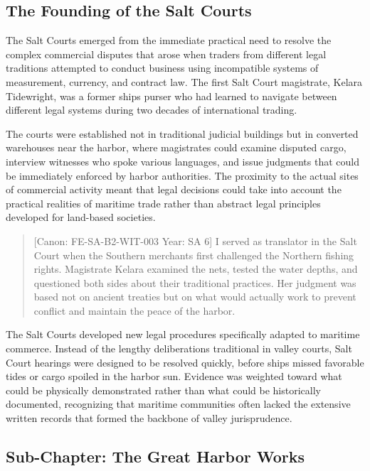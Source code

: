\subsection{The Founding of the Salt
Courts}\label{the-founding-of-the-salt-courts}

The Salt Courts emerged from the immediate practical need to resolve the
complex commercial disputes that arose when traders from different legal
traditions attempted to conduct business using incompatible systems of
measurement, currency, and contract law. The first Salt Court
magistrate, Kelara Tidewright, was a former ship\textquotesingle s
purser who had learned to navigate between different legal systems
during two decades of international trading.

The courts were established not in traditional judicial buildings but in
converted warehouses near the harbor, where magistrates could examine
disputed cargo, interview witnesses who spoke various languages, and
issue judgments that could be immediately enforced by harbor
authorities. The proximity to the actual sites of commercial activity
meant that legal decisions could take into account the practical
realities of maritime trade rather than abstract legal principles
developed for land-based societies.

\begin{quote}
{[}Canon: FE-SA-B2-WIT-003 \textbar{} Year: SA 6{]} I served as
translator in the Salt Court when the Southern merchants first
challenged the Northern fishing rights. Magistrate Kelara examined the
nets, tested the water depths, and questioned both sides about their
traditional practices. Her judgment was based not on ancient treaties
but on what would actually work to prevent conflict and maintain the
peace of the harbor.
\end{quote}

The Salt Courts developed new legal procedures specifically adapted to
maritime commerce. Instead of the lengthy deliberations traditional in
valley courts, Salt Court hearings were designed to be resolved quickly,
before ships missed favorable tides or cargo spoiled in the harbor sun.
Evidence was weighted toward what could be physically demonstrated
rather than what could be historically documented, recognizing that
maritime communities often lacked the extensive written records that
formed the backbone of valley jurisprudence.

\subsection{Sub-Chapter: The Great Harbor
Works}\label{sub-chapter-the-great-harbor-works}

